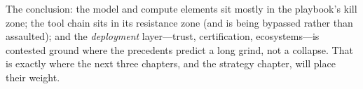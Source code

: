 The conclusion: the model and compute elements sit mostly in the playbook's kill zone; the tool chain sits in its resistance zone (and is being bypassed rather than assaulted); and the \emph{deployment} layer---trust, certification, ecosystems---is contested ground where the precedents predict a long grind, not a collapse. That is exactly where the next three chapters, and the strategy chapter, will place their weight.

